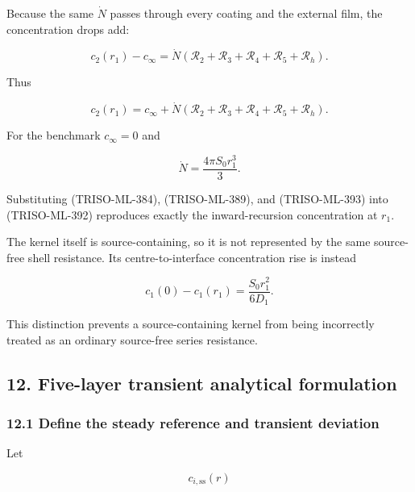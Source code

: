 \documentclass[11pt,a4paper]{article}
\begin{document}
Because the same $\dot N$ passes through every coating and the external film, the concentration drops add:

\begin{equation}
c_2(r_1)-c_\infty
=
\dot N
\left(
\mathcal R_2+\mathcal R_3+\mathcal R_4+\mathcal R_5+\mathcal R_h
\right).
\tag{TRISO-ML-391}
\label{eq:triso-ml-391}
\end{equation}

Thus

\begin{equation}
\boxed{
c_2(r_1)
=
c_\infty
+
\dot N
\left(
\mathcal R_2+\mathcal R_3+\mathcal R_4+\mathcal R_5+\mathcal R_h
\right).
}
\tag{TRISO-ML-392}
\label{eq:triso-ml-392}
\end{equation}

For the benchmark $c_\infty=0$ and

\begin{equation}
\dot N=\frac{4\pi S_0r_1^3}{3}.
\tag{TRISO-ML-393}
\label{eq:triso-ml-393}
\end{equation}

Substituting (TRISO-ML-384), (TRISO-ML-389), and (TRISO-ML-393) into (TRISO-ML-392) reproduces exactly the inward-recursion concentration at $r_1$.

The kernel itself is source-containing, so it is not represented by the same source-free shell resistance. Its centre-to-interface concentration rise is instead

\begin{equation}
c_1(0)-c_1(r_1)
=
\frac{S_0r_1^2}{6D_1}.
\tag{TRISO-ML-394}
\label{eq:triso-ml-394}
\end{equation}

This distinction prevents a source-containing kernel from being incorrectly treated as an ordinary source-free series resistance.

\subsection*{12. Five-layer transient analytical formulation}

\subsubsection*{12.1 Define the steady reference and transient deviation}

Let

\begin{equation}
c_{i,\mathrm{ss}}(r)
\tag{TRISO-ML-400}
\label{eq:triso-ml-400}
\end{equation}
\end{document}
